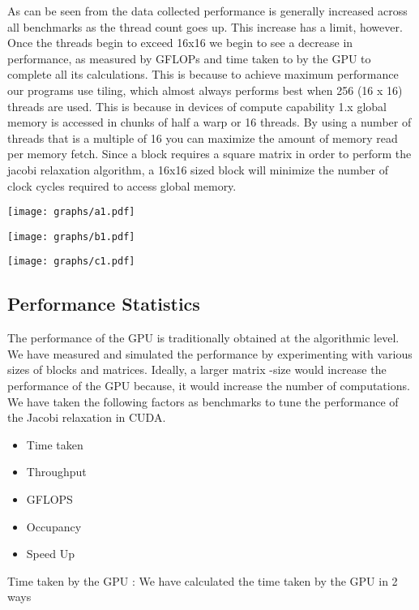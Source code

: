 \documentclass[10pt]{article}
\makeatletter
\newenvironment{figurehere}
{\def\@captype{figure}}
{}
\makeatother
\begin{document}
\begin{multicols}{2}
  As can be seen from the data collected performance is generally increased across all benchmarks as the thread count goes up.
  This increase has a limit, however.
  Once the threads begin to exceed 16x16 we begin to see a decrease in performance, as measured by GFLOPs and time taken to by the GPU to complete all its calculations.
  This is because to achieve maximum performance our programs use tiling, which almost always performs best when 256 (16 x 16) threads are used.
  This is because in devices of compute capability 1.x global memory is accessed in chunks of half a warp or 16 threads.
  By using a number of threads that is a multiple of 16 you can maximize the amount of memory read per memory fetch.
  Since a block requires a square matrix in order to perform the jacobi relaxation algorithm, a 16x16 sized block will minimize the number of clock cycles required to access global memory.

  \begin{figurehere}
    \centering
    \texttt{[image: graphs/a1.pdf]}
    \caption{}
    \label{fig:time_taken1}
  \end{figurehere}

  \begin{figurehere}
    \centering
    \texttt{[image: graphs/b1.pdf]}
    \caption{}
    \label{fig:time_taken2}
  \end{figurehere}

  \begin{figurehere}
    \centering
    \texttt{[image: graphs/c1.pdf]}
    \caption{}
    \label{fig:time_taken3}
  \end{figurehere}

  \subsection{Performance Statistics}
  The performance of the GPU is traditionally obtained at the algorithmic level.
  We have measured and simulated the performance by experimenting with various sizes of blocks and matrices.
  Ideally, a larger matrix -size would increase the performance of the GPU because,  it would increase  the  number of computations.
  We have taken the following factors as benchmarks to tune the performance of the Jacobi relaxation in CUDA.
  \begin{itemize}
    \item Time taken
    \item Throughput
    \item GFLOPS
    \item Occupancy
    \item Speed Up
  \end{itemize}
  Time taken by the GPU  : We have calculated the time taken by the GPU in 2 ways


\end{multicols}
\end{document}
